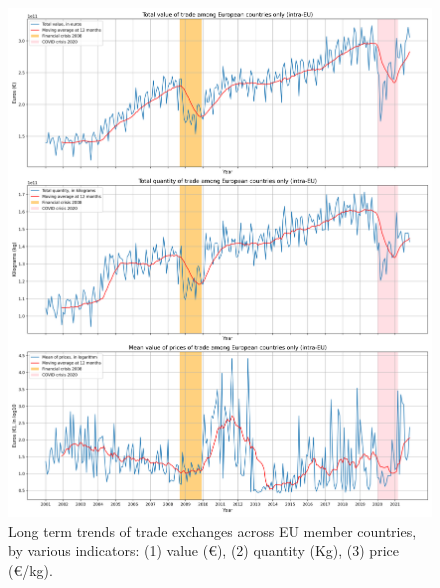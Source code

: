 \begin{figure}
    \centering
    \includegraphics[width=\textwidth]{tex/pics/TOTAL_VQP_INTRA.png}
    \caption{Long term trends of trade exchanges across EU member countries, by various indicators: (1) value (€), (2) quantity (Kg), (3) price (€/kg).}
    \label{fig:totaleu}
\end{figure}


